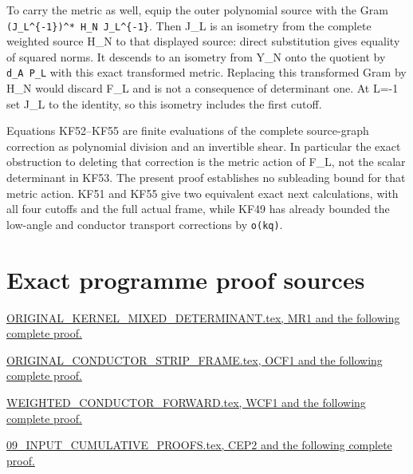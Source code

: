 To carry the metric as well, equip the outer polynomial source with the Gram \nolinkurl{(J_L^{-1})^* H_N J_L^{-1}}. Then J\_L is an isometry from the complete weighted source H\_N to that displayed source: direct substitution gives equality of squared norms. It descends to an isometry from Y\_N onto the quotient by \texttt{d\_A\ P\_L} with this exact transformed metric. Replacing this transformed Gram by H\_N would discard F\_L and is not a consequence of determinant one. At L=-1 set J\_L to the identity, so this isometry includes the first cutoff.

Equations KF52--KF55 are finite evaluations of the complete source-graph correction as polynomial division and an invertible shear. In particular the exact obstruction to deleting that correction is the metric action of F\_L, not the scalar determinant in KF53. The present proof establishes no subleading bound for that metric action. KF51 and KF55 give two equivalent exact next calculations, with all four cutoffs and the full actual frame, while KF49 has already bounded the low-angle and conductor transport corrections by \texttt{o(kq)}.

\section*{Exact programme proof sources}
\par\href{https://github.com/KokunoYumeto/zeta-function-research-reader/blob/5992ad50c0f2a06921f1fcaded7b4e38097c0739/workbenches/splitzero-tandem/continuations/20260920-original-kernel-mixed-determinants/ORIGINAL_KERNEL_MIXED_DETERMINANT.tex#L36}{ORIGINAL\_KERNEL\_MIXED\_DETERMINANT.tex, MR1 and the following complete proof.}
\par\href{https://github.com/KokunoYumeto/zeta-function-research-reader/blob/5992ad50c0f2a06921f1fcaded7b4e38097c0739/workbenches/splitzero-tandem/continuations/20260920-original-kernel-mixed-determinants/providers/ORIGINAL_CONDUCTOR_STRIP_FRAME.tex#L27}{ORIGINAL\_CONDUCTOR\_STRIP\_FRAME.tex, OCF1 and the following complete proof.}
\par\href{https://github.com/KokunoYumeto/zeta-function-research-reader/blob/5992ad50c0f2a06921f1fcaded7b4e38097c0739/workbenches/splitzero-tandem/continuations/20260920-original-kernel-mixed-determinants/providers/WEIGHTED_CONDUCTOR_FORWARD.tex#L28}{WEIGHTED\_CONDUCTOR\_FORWARD.tex, WCF1 and the following complete proof.}
\par\href{https://github.com/KokunoYumeto/zeta-function-research-reader/blob/5992ad50c0f2a06921f1fcaded7b4e38097c0739/workbenches/splitzero-tandem/continuations/20260920-original-kernel-mixed-determinants/providers/09_INPUT_CUMULATIVE_PROOFS.tex#L19060}{09\_INPUT\_CUMULATIVE\_PROOFS.tex, CEP2 and the following complete proof.}
